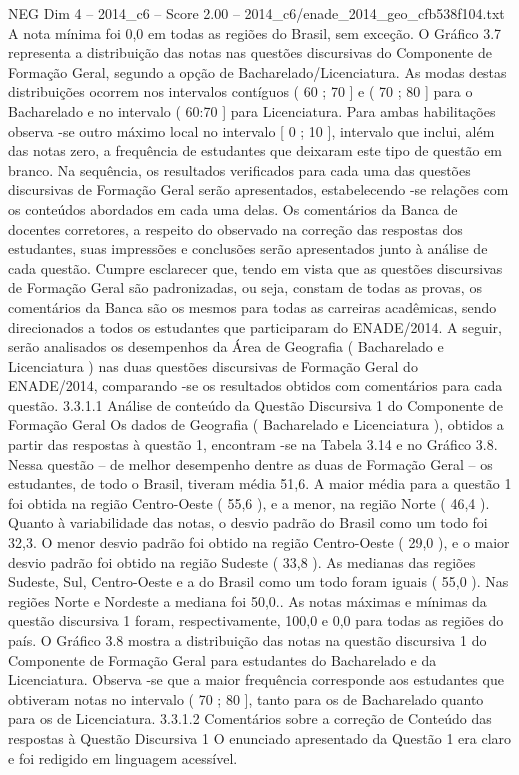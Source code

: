 \begin{textsample}{NEG Dim 4 – 2014\_c6 – Score 2.00 – 2014\_c6/enade\_2014\_geo\_cfb538f104.txt}
A nota mínima foi 0,0 em todas as regiões do Brasil, sem exceção.
O Gráfico 3.7 representa a distribuição das notas nas questões discursivas do Componente de Formação Geral, segundo a opção de Bacharelado/Licenciatura.
As modas destas distribuições ocorrem nos intervalos contíguos ( 60 ; 70 ] e ( 70 ; 80 ] para o Bacharelado e no intervalo ( 60:70 ] para Licenciatura.
Para ambas habilitações observa -se outro máximo local no intervalo [ 0 ; 10 ], intervalo que inclui, além das notas zero, a frequência de estudantes que deixaram este tipo de questão em branco.
Na sequência, os resultados verificados para cada uma das questões discursivas de Formação Geral serão apresentados, estabelecendo -se relações com os conteúdos abordados em cada uma delas.
Os comentários da Banca de docentes corretores, a respeito do observado na correção das respostas dos estudantes, suas impressões e conclusões serão apresentados junto à análise de cada questão.
Cumpre esclarecer que, tendo em vista que as questões discursivas de Formação Geral são padronizadas, ou seja, constam de todas as provas, os comentários da Banca são os mesmos para todas as carreiras acadêmicas, sendo direcionados a todos os estudantes que participaram do ENADE/2014.
A seguir, serão analisados os desempenhos da Área de Geografia ( Bacharelado e Licenciatura ) nas duas questões discursivas de Formação Geral do ENADE/2014, comparando -se os resultados obtidos com comentários para cada questão. 3.3.1.1 Análise de conteúdo da Questão Discursiva 1 do Componente de Formação Geral Os dados de Geografia ( Bacharelado e Licenciatura ), obtidos a partir das respostas à questão 1, encontram -se na Tabela 3.14 e no Gráfico 3.8.
Nessa questão – de melhor desempenho dentre as duas de Formação Geral – os estudantes, de todo o Brasil, tiveram média 51,6.
A maior média para a questão 1 foi obtida na região Centro-Oeste ( 55,6 ), e a menor, na região Norte ( 46,4 ).
Quanto à variabilidade das notas, o desvio padrão do Brasil como um todo foi 32,3.
O menor desvio padrão foi obtido na região Centro-Oeste ( 29,0 ), e o maior desvio padrão foi obtido na região Sudeste ( 33,8 ).
As medianas das regiões Sudeste, Sul, Centro-Oeste e a do Brasil como um todo foram iguais ( 55,0 ).
Nas regiões Norte e Nordeste a mediana foi 50,0..
As notas máximas e mínimas da questão discursiva 1 foram, respectivamente, 100,0 e 0,0 para todas as regiões do país.
O Gráfico 3.8 mostra a distribuição das notas na questão discursiva 1 do Componente de Formação Geral para estudantes do Bacharelado e da Licenciatura.
Observa -se que a maior frequência corresponde aos estudantes que obtiveram notas no intervalo ( 70 ; 80 ], tanto para os de Bacharelado quanto para os de Licenciatura. 3.3.1.2 Comentários sobre a correção de Conteúdo das respostas à Questão Discursiva 1 O enunciado apresentado da Questão 1 era claro e foi redigido em linguagem acessível.

\end{textsample}
